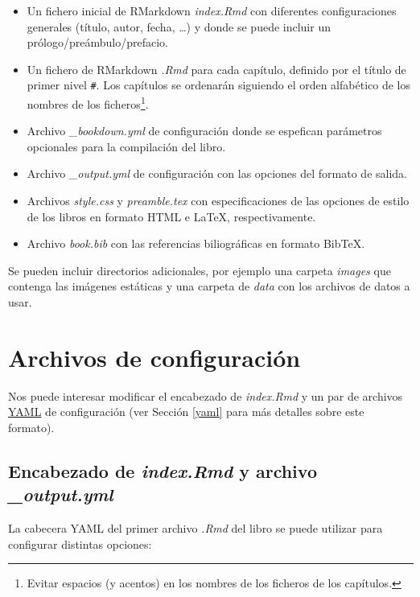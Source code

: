 \documentclass[]{book}
\let\rmarkdownfootnote\footnote%
\def\footnote{\protect\rmarkdownfootnote}
\theoremstyle{definition}
\theoremstyle{definition}
\theoremstyle{definition}
\theoremstyle{remark}
\begin{document}
\begin{itemize}
\item
  Un fichero inicial de RMarkdown \emph{index.Rmd} con diferentes
  configuraciones generales (título, autor, fecha, \ldots{}) y donde se
  puede incluir un prólogo/preámbulo/prefacio.
\item
  Un fichero de RMarkdown \emph{.Rmd} para cada capítulo, definido por
  el título de primer nivel \texttt{\#}. Los capítulos se ordenarán
  siguiendo el orden alfabético de los nombres de los ficheros\footnote{Evitar
    espacios (y acentos) en los nombres de los ficheros de los
    capítulos.}.
\item
  Archivo \emph{\_bookdown.yml} de configuración donde se espefican
  parámetros opcionales para la compilación del libro.
\item
  Archivo \emph{\_output.yml} de configuración con las opciones del
  formato de salida.
\item
  Archivos \emph{style.css} y \emph{preamble.tex} con especificaciones
  de las opciones de estilo de los libros en formato HTML e LaTeX,
  respectivamente.
\item
  Archivo \emph{book.bib} con las referencias biliográficas en formato
  BibTeX.
\end{itemize}

Se pueden incluir directorios adicionales, por ejemplo una carpeta
\emph{images} que contenga las imágenes estáticas y una carpeta de
\emph{data} con los archivos de datos a usar.

\chapter{Archivos de configuración}\label{archivos-de-configuracion}

Nos puede interesar modificar el encabezado de \emph{index.Rmd} y un par
de archivos \href{https://en.wikipedia.org/wiki/YAML}{YAML} de
configuración (ver Sección \ref{yaml} para más detalles sobre este
formato).

\section{\texorpdfstring{Encabezado de \emph{index.Rmd} y archivo
\emph{\_output.yml}}{Encabezado de index.Rmd y archivo \_output.yml}}\label{encabezado-de-index.rmd-y-archivo-_output.yml}

La cabecera YAML del primer archivo \emph{.Rmd} del libro se puede
utilizar para configurar distintas opciones:
\end{document}
